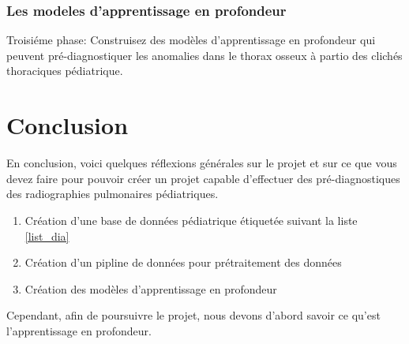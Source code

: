             \subsubsection*{Les modeles d'apprentissage en profondeur}
                Troisiéme phase:
                Construisez des modèles d'apprentissage en profondeur qui peuvent pré-diagnostiquer les anomalies dans le thorax osseux à partio des clichés thoraciques pédiatrique.


    \section*{Conclusion}
    En conclusion, voici quelques réflexions générales sur le projet et sur ce que vous devez faire pour pouvoir créer un projet capable d'effectuer  des pré-diagnostiques des radiographies pulmonaires pédiatriques.
    \begin{enumerate}
        \item Création d'une base de données pédiatrique étiquetée suivant la liste \ref{list_dia}
        \item Création d'un pipline de données pour prétraitement des données
        \item Création des modèles d'apprentissage en profondeur
    \end{enumerate}
    Cependant, afin de poursuivre le projet, nous devons d'abord savoir ce qu'est  l'apprentissage en profondeur.